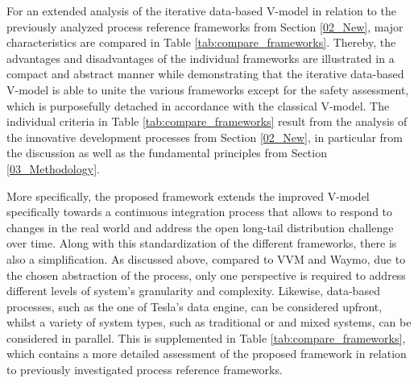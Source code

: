 For an extended analysis of the iterative data-based V-model in relation to the previously analyzed process reference frameworks from Section \ref{02_New}, major characteristics are compared in Table \ref{tab:compare_frameworks}. Thereby, the advantages and disadvantages of the individual frameworks are illustrated in a compact and abstract manner while demonstrating that the iterative data-based V-model is able to unite the various frameworks except for the safety assessment, which is purposefully detached in accordance with the classical V-model. The individual criteria in Table \ref{tab:compare_frameworks} result from the analysis of the innovative development processes from Section \ref{02_New}, in particular from the discussion as well as the fundamental principles from Section \ref{03_Methodology}.

More specifically, the proposed framework extends the improved V-model specifically towards a continuous integration process that allows to respond to changes in the real world and address the open long-tail distribution challenge over time. Along with this standardization of the different frameworks, there is also a simplification. As discussed above, compared to VVM and Waymo, due to the chosen abstraction of the process, only one perspective is required to address different levels of system's granularity and complexity. Likewise, data-based processes, such as the one of Tesla's data engine, can be considered upfront, whilst a variety of system types, such as traditional or and mixed systems, can be considered in parallel. This is supplemented in Table \ref{tab:compare_frameworks}, which contains a more detailed assessment of the proposed framework in relation to previously investigated process reference frameworks. 

\newcommand\RotText[1]{\rotatebox{90}{\parbox{3.9cm}{\raggedright#1}}}

